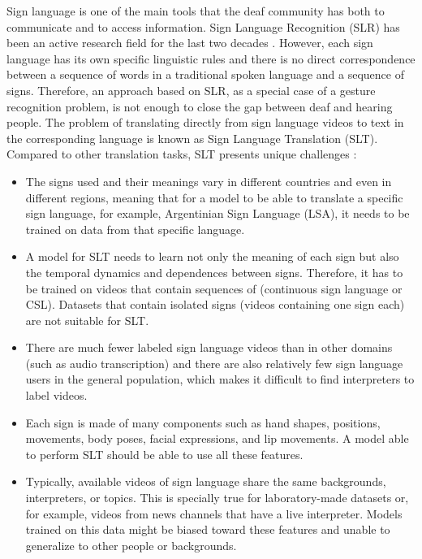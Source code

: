 Sign language is one of the main tools that the deaf community has both to communicate and to access information. Sign Language Recognition (SLR) has been an active research field for the last two decades \cite{camgoz2018neural}. However, each sign language has its own specific linguistic rules \cite{stokoe1980sign} and there is no direct correspondence between a sequence of words in a traditional spoken language and a sequence of signs. Therefore, an approach based on SLR, as a special case of a gesture recognition problem, is not enough to close the gap between deaf and hearing people. The problem of translating directly from sign language videos to text in the corresponding language is known as Sign Language Translation (SLT).
 Compared to other translation tasks, SLT presents unique challenges \cite{camgoz2018neural}:

\begin{itemize}

    \item The signs used and their meanings vary in different countries and even in different regions, meaning that for a model to be able to translate a specific sign language, for example, Argentinian Sign Language (LSA), it needs to be trained on data from that specific language.
    
    \item A model for SLT needs to learn not only the meaning of each sign but also the temporal dynamics and dependences between signs. Therefore, it has to be trained on videos that contain sequences of (continuous sign language or CSL). Datasets that contain isolated signs (videos containing one sign each) are not suitable for SLT.
    
    \item There are much fewer labeled sign language videos than in other domains (such as audio transcription) and there are also relatively few sign language users in the general population, which makes it difficult to find interpreters to label videos.
    
    \item Each sign is made of many components such as hand shapes, positions, movements, body poses, facial expressions, and lip movements. A model able to perform SLT should be able to use all these features.
    
    \item Typically, available videos of sign language share the same backgrounds, interpreters, or topics. This is specially true for laboratory-made datasets or, for example, videos from news channels that have a live interpreter. Models trained on this data might be biased toward these features and unable to generalize to other people or backgrounds.
    
\end{itemize}


